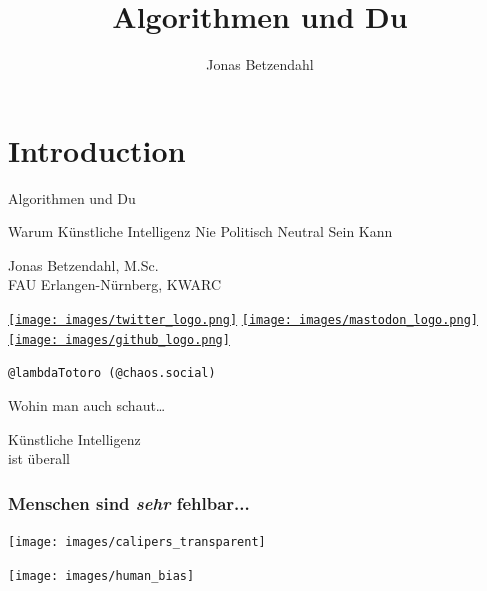 \documentclass[aspectratio=43,usenames,dvipsnames]{beamer}
\author{Jonas Betzendahl}
\title{Algorithmen und Du}
\begin{document}
\section{Introduction}

\begin{frame}
\begin{center}
\vfill
\huge Algorithmen und Du
\normalsize 
\smallskip
\smallskip

Warum Künstliche Intelligenz Nie Politisch Neutral Sein Kann
\bigskip\bigskip

\large Jonas Betzendahl, M.Sc.\\\normalsize FAU Erlangen-Nürnberg, KWARC
\bigskip\bigskip\large

\href{https://twitter.com/lambdatotoro}{\texttt{[image: images/twitter\_logo.png]}}
\href{https://chaos.social/@lambdatotoro}{\texttt{[image: images/mastodon\_logo.png]}}
\href{https://github.com/lambdaTotoro}{\texttt{[image: images/github\_logo.png]}}

\texttt{@lambdaTotoro (@chaos.social)}
\end{center}
\end{frame}



\begin{frame}
\begin{center}
\LARGE
Wohin man auch schaut\dots
\bigskip

\Huge
Künstliche Intelligenz\\
ist überall
\end{center}
\end{frame}

\begin{frame}
\frametitle{Menschen sind \emph{sehr} fehlbar...}
\begin{minipage}{0.5\textwidth}
\begin{center}
\texttt{[image: images/calipers\_transparent]}
\end{center}
\end{minipage}\begin{minipage}{0.5\textwidth}
\begin{center}
\pause
\texttt{[image: images/human\_bias]}
\end{center}
\end{minipage}
\end{frame}
\end{document}
